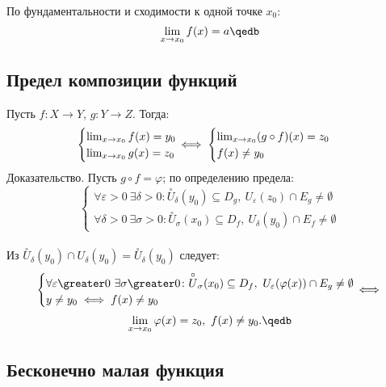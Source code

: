 По фундаментальности и сходимости к одной точке $x_0$:
$$\lim_{x\to x_0}f(x)=a\qedb$$

\subsection{Предел композиции функций}

Пусть $f\colon X\to Y$, $g\colon Y\to Z$. Тогда:
$$\begin{cases}
\lim_{x\to x_0}f(x)=y_0\\
\lim_{x\to x_0}g(x)=z_0
\end{cases}\hspace*{-12pt}\iff\begin{cases}
\lim_{x\to x_0}(g\circ f)(x)=z_0\\
f(x)\neq y_0
\end{cases}$$
{\bold Доказательство.} Пусть $g\circ f=\varphi$; по определению предела:\\[-9pt]
$$\begin{cases}
\forall\varepsilon\greater 0\ \exists\delta\greater 0\colon\overset{\circ}{U}_\delta(y_0)
\subseteq D_g,\ U_\varepsilon(z_0)\cap E_g\neq\emptyset\\
\forall\delta\greater 0\ \exists\sigma\greater 0\colon\overset{\circ}{U}_\sigma(x_0)
\subseteq D_f,\ U_\delta(y_0)\cap E_f\neq\emptyset
\end{cases}$$\\[-6pt]
Из $\overset{\circ}{U}_\delta(y_0)\cap U_\delta(y_0)=\overset{\circ}{U}_\delta(y_0)$ 
следует:\\[-14pt]
$$\begin{cases}
\forall\varepsilon\greater 0\ \exists\sigma\greater 0\colon\overset{\circ}{U}_\sigma(x_0)
\subseteq D_f,\ U_\varepsilon(\varphi(x))\cap E_g\neq\emptyset\\
y\neq y_0\iff f(x)\neq y_0
\end{cases}\hspace*{-12pt}\iff$$
$$\lim_{x\to x_0}\varphi(x)=z_0,\ f(x)\neq y_0.\qedb$$

\subsection{Бесконечно малая функция}

